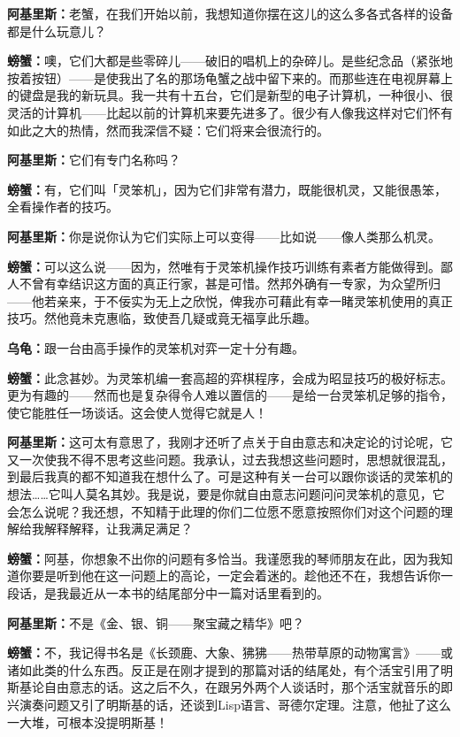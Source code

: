 \documentclass[
  12pt,
  twoside,
  openright,
  oldfontcommands,
]{memoir}
\newcommand{\kaitismall}[1]{{\kaitifamily\small #1}}
\newcommand{\dialogname}[1]{{\heifamily\bfseries #1}}
\begin{document}
\dialogname{阿基里斯：}老蟹，在我们开始以前，我想知道你摆在这儿的这么多各式各样的设备都是什么玩意儿？

\dialogname{螃蟹：}噢，它们大都是些零碎儿------破旧的唱机上的杂碎儿。是些纪念品\kaitismall{（紧张地按着按钮）}------是使我出了名的那场龟蟹之战中留下来的。而那些连在电视屏幕上的键盘是我的新玩具。我一共有十五台，它们是新型的电子计算机，一种很小、很灵活的计算机------比起以前的计算机来要先进多了。很少有人像我这样对它们怀有如此之大的热情，然而我深信不疑：它们将来会很流行的。

\dialogname{阿基里斯：}它们有专门名称吗？

\dialogname{螃蟹：}有，它们叫「灵笨机」，因为它们非常有潜力，既能很机灵，又能很愚笨，全看操作者的技巧。

\dialogname{阿基里斯：}你是说你认为它们实际上可以变得------比如说------像人类那么机灵。

\dialogname{螃蟹：}可以这么说------因为，然唯有于灵笨机操作技巧训练有素者方能做得到。鄙人不曾有幸结识这方面的真正行家，甚是可惜。然邦外确有一专家，为众望所归------他若亲来，于不佞实为无上之欣悦，俾我亦可藉此有幸一睹灵笨机使用的真正技巧。然他竟未克惠临，致使吾几疑或竟无福享此乐趣。

\dialogname{乌龟：}跟一台由高手操作的灵笨机对弈一定十分有趣。

\dialogname{螃蟹：}此念甚妙。为灵笨机编一套高超的弈棋程序，会成为昭显技巧的极好标志。更为有趣的------然而也是复杂得令人难以置信的------是给一台灵笨机足够的指令，使它能胜任一场谈话。这会使人觉得它就是人！

\dialogname{阿基里斯：}这可太有意思了，我刚才还听了点关于自由意志和决定论的讨论呢，它又一次使我不得不思考这些问题。我承认，过去我想这些问题时，思想就很混乱，到最后我真的都不知道我在想什么了。可是这种有关一台可以跟你谈话的灵笨机的想法\ldots\ldots 它叫人莫名其妙。我是说，要是你就自由意志问题问问灵笨机的意见，它会怎么说呢？我还想，不知精于此理的你们二位愿不愿意按照你们对这个问题的理解给我解释解释，让我满足满足？

\dialogname{螃蟹：}阿基，你想象不出你的问题有多恰当。我谨愿我的琴师朋友在此，因为我知道你要是听到他在这一问题上的高论，一定会着迷的。趁他还不在，我想告诉你一段话，是我最近从一本书的结尾部分中一篇对话里看到的。

\dialogname{阿基里斯：}不是《金、银、铜------聚宝藏之精华》吧？

\dialogname{螃蟹：}不，我记得书名是《长颈鹿、大象、狒狒------热带草原的动物寓言》------或诸如此类的什么东西。反正是在刚才提到的那篇对话的结尾处，有个活宝引用了明斯基论自由意志的话。这之后不久，在跟另外两个人谈话时，那个活宝就音乐的即兴演奏问题又引了明斯基的话，还谈到Lisp语言、哥德尔定理。注意，他扯了这么一大堆，可根本没提明斯基！
\end{document}
